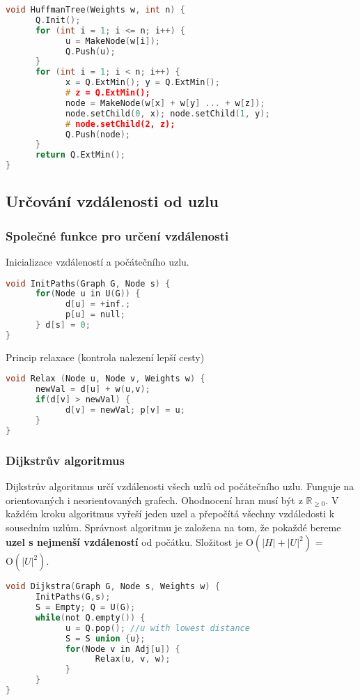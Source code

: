 \documentclass[12pt]{article}
\begin{document}
\begin{lstlisting}[language=c]
void HuffmanTree(Weights w, int n) {
      Q.Init();
      for (int i = 1; i <= n; i++) {
            u = MakeNode(w[i]);
            Q.Push(u);
      }
      for (int i = 1; i < n; i++) {
            x = Q.ExtMin(); y = Q.ExtMin(); 
            # z = Q.ExtMin();
            node = MakeNode(w[x] + w[y] ... + w[z]); 
            node.setChild(0, x); node.setChild(1, y);
            # node.setChild(2, z);
            Q.Push(node);
      }
      return Q.ExtMin();
}
\end{lstlisting}

\subsection{Určování vzdálenosti od uzlu}
\subsubsection{Společné funkce pro určení vzdálenosti}
Inicializace vzdáleností a počátečního uzlu.
\begin{lstlisting}[language=c]
void InitPaths(Graph G, Node s) {
      for(Node u in U(G)) {
            d[u] = +inf.;
            p[u] = null;
      } d[s] = 0;
}
\end{lstlisting}

Princip relaxace (kontrola nalezení lepší cesty)
\begin{lstlisting}[language=c]
void Relax (Node u, Node v, Weights w) {
      newVal = d[u] + w(u,v);
      if(d[v] > newVal) {
            d[v] = newVal; p[v] = u;
      }
}
\end{lstlisting}

\subsubsection{Dijkstrův algoritmus}
Dijkstrův algoritmus určí vzdálenosti všech uzlů od počátečního uzlu. Funguje na orientovaných i neorientovaných grafech. Ohodnocení hran musí být z $\mathbb{R}_{\geq 0}$.
V každém kroku algoritmus vyřeší jeden uzel a přepočítá všechny vzdáledosti k sousedním uzlům. Správnost algoritmu je založena na tom, že pokaždé bereme \textbf{uzel s nejmenší vzdáleností} od počátku.
Složitost je $\textrm{O}(\left|H\right|+\left|U\right|^2)$ = $\textrm{O}(\left|U\right|^2)$.

\begin{lstlisting}[language=c]
void Dijkstra(Graph G, Node s, Weights w) {
      InitPaths(G,s);
      S = Empty; Q = U(G);
      while(not Q.empty()) {
            u = Q.pop(); //u with lowest distance
            S = S union {u}; 
            for(Node v in Adj[u]) {
                  Relax(u, v, w);
            }
      }
}
\end{lstlisting}
\end{document}

